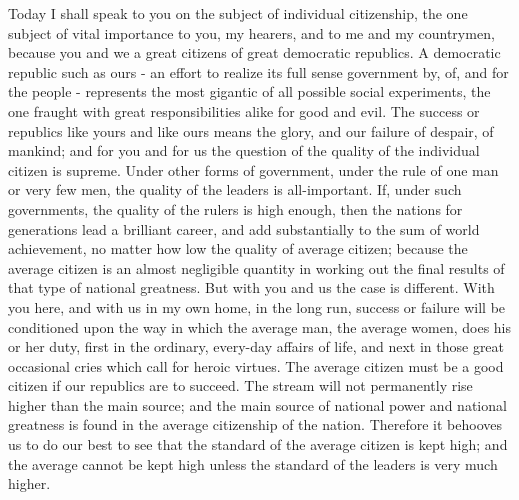 \documentclass{scrbook}
\begin{document}
Today I shall speak to you on the subject of individual citizenship, the one subject of
vital importance to you, my hearers, and to me and my countrymen, because you and we a
great citizens of great democratic republics. A democratic republic such as ours - an effort
to realize its full sense government by, of, and for the people - represents the most gigantic
of all possible social experiments, the one fraught with great responsibilities alike for good
and evil. The success or republics like yours and like ours means the glory, and our failure
of despair, of mankind; and for you and for us the question of the quality of the individual
citizen is supreme. Under other forms of government, under the rule of one man or very
few men, the quality of the leaders is all-important. If, under such governments, the quality
of the rulers is high enough, then the nations for generations lead a brilliant career, and add
substantially to the sum of world achievement, no matter how low the quality of average
citizen; because the average citizen is an almost negligible quantity in working out the final
results of that type of national greatness. But with you and us the case is different. With you
here, and with us in my own home, in the long run, success or failure will be conditioned
upon the way in which the average man, the average women, does his or her duty, first in
the ordinary, every-day affairs of life, and next in those great occasional cries which call for
heroic virtues. The average citizen must be a good citizen if our republics are to succeed.
The stream will not permanently rise higher than the main source; and the main source
of national power and national greatness is found in the average citizenship of the nation.
Therefore it behooves us to do our best to see that the standard of the average citizen is kept
high; and the average cannot be kept high unless the standard of the leaders is very much
higher.
\end{document}
